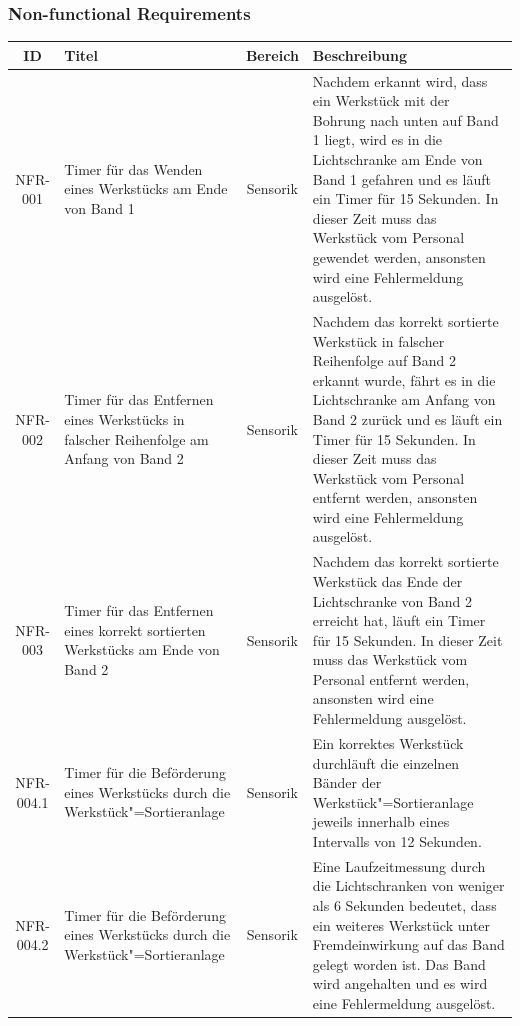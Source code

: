 \documentclass[oneside,a4paper,titlepage]{scrartcl}              %
\begin{document}
\subsubsection{Non-functional Requirements}
\begin{small}
  \begin{center}
    \begin{longtable}{|c|p{4cm}|c|p{7cm}|}
      \hline
      \textbf{ID} & \textbf{Titel} & \textbf{Bereich} & \textbf{Beschreibung}\\
      \toprule
      \endhead
      \hline
      NFR-001 & Timer für das Wenden eines Werkstücks am Ende von Band 1 & Sensorik & Nachdem erkannt wird, dass ein Werkstück mit der Bohrung nach unten auf Band 1 liegt, wird es in die Lichtschranke am Ende von Band 1 gefahren und es läuft ein Timer für 15 Sekunden. In dieser Zeit muss das Werkstück vom Personal gewendet werden, ansonsten wird eine Fehlermeldung ausgelöst.\\
      \hline
      \rowcolor{lightgray} NFR-002 & Timer für das Entfernen eines Werkstücks in falscher Reihenfolge am Anfang von Band 2 & Sensorik & Nachdem das korrekt sortierte Werkstück in falscher Reihenfolge auf Band 2 erkannt wurde, fährt es in die Lichtschranke am Anfang von Band 2 zurück und es läuft ein Timer für 15 Sekunden. In dieser Zeit muss das Werkstück vom Personal entfernt werden, ansonsten wird eine Fehlermeldung ausgelöst.\\
      \hline
      NFR-003 & Timer für das Entfernen eines korrekt sortierten Werkstücks am Ende von Band 2 & Sensorik & Nachdem das korrekt sortierte Werkstück das Ende der Lichtschranke von Band 2 erreicht hat, läuft ein Timer für 15 Sekunden. In dieser Zeit muss das Werkstück vom Personal entfernt werden, ansonsten wird eine Fehlermeldung ausgelöst.\\
      \hline
      \rowcolor{lightgray} NFR-004.1 & Timer für die Beförderung eines Werkstücks durch die Werkstück"=Sortieranlage & Sensorik & Ein korrektes Werkstück durchläuft die einzelnen Bänder der Werkstück"=Sortieranlage jeweils innerhalb eines Intervalls von 12 Sekunden.\\
      \hline
      \rowcolor{lightgray} NFR-004.2 & Timer für die Beförderung eines Werkstücks durch die Werkstück"=Sortieranlage & Sensorik & Eine Laufzeitmessung durch die Lichtschranken von weniger als 6 Sekunden bedeutet, dass ein weiteres Werkstück unter Fremdeinwirkung auf das Band gelegt worden ist. Das Band wird angehalten und es wird eine Fehlermeldung ausgelöst.\\

\end{longtable}
\end{center}
\end{small}
\end{document}
